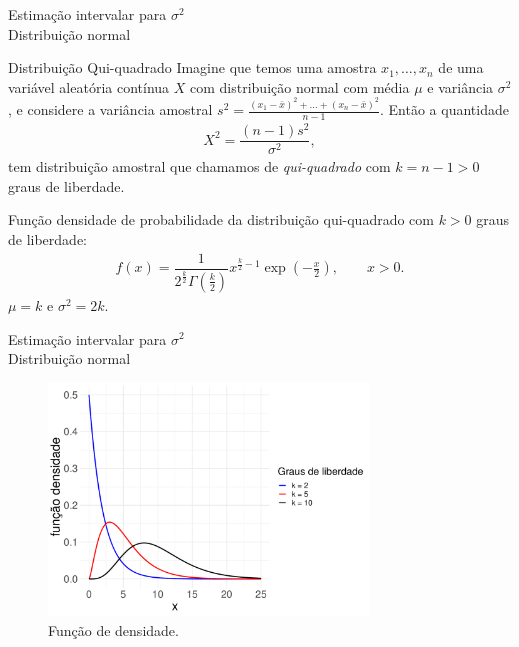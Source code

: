 \documentclass[8pt]{beamer}
\begin{document}
\begin{frame}{Estimação intervalar para $\sigma^2$\\ Distribuição normal}

\begin{block}{Distribuição Qui-quadrado}
	Imagine que temos uma amostra $x_1, \dots, x_n$ de uma variável aleatória contínua $X$ com distribuição normal com  média $\mu$ e variância $\sigma^2$, e considere a variância amostral $s^2 = \frac{(x_1 - \bar{x})^2 + \dots + (x_n - \bar{x})^2}{n-1}$. Então a quantidade
	\begin{align*}
		X^2 = \dfrac{(n-1)s^2}{\sigma^2},
	\end{align*}
	tem distribuição amostral que chamamos de \textit{qui-quadrado} com $k=n-1>0$ graus de liberdade.
	\vfill

	
	Função densidade de probabilidade da distribuição qui-quadrado com $k>0$ graus de liberdade:
	\begin{align*}
		f(x) = \dfrac{1}{2^{\frac{k}{2}} \Gamma\left( \frac{k}{2} \right)} x^{\frac{k}{2} - 1} \exp\left(-\frac{x}{2} \right), \qquad x> 0.
	\end{align*}
	$\mu = k$ e $\sigma^2 = 2k$.
\end{block}
	
\end{frame}

\begin{frame}{Estimação intervalar para $\sigma^2$\\ Distribuição normal}

\begin{figure}[htbp]
	\centering
	\caption{Função de densidade.}
	\includegraphics[width=8.5cm]{fd_qui_quadrado.pdf}
\end{figure}
	
\end{frame}
\end{document}
